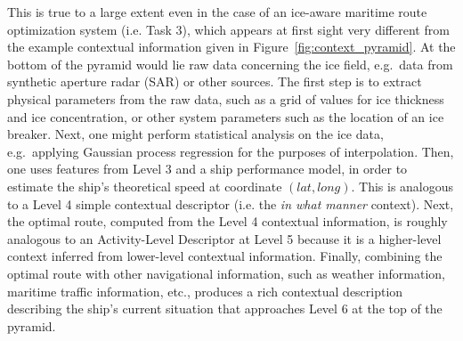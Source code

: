 This is true to a large extent even in the case of an ice-aware maritime route optimization system (i.e. Task 3), which appears at first sight very different from the example contextual information given in Figure~\ref{fig:context_pyramid}. At the bottom of the pyramid would lie raw data concerning the ice field, e.g.\ data from synthetic aperture radar (SAR) or other sources. The first step is to extract physical parameters from the raw data, such as a grid of values for ice thickness and ice concentration, or other system parameters such as the location of an ice breaker. Next, one might perform statistical analysis on the ice data, e.g.\ applying Gaussian process regression for the purposes of interpolation. Then, one uses features from Level 3 and a ship performance model, in order to estimate the ship's theoretical speed at coordinate $(lat, long)$. This is analogous to a Level 4 simple contextual descriptor (i.e. the \emph{in what manner} context). Next, the optimal route, computed from the Level 4 contextual information, is roughly analogous to an Activity-Level Descriptor at Level 5 because it is a higher-level context inferred from lower-level contextual information. Finally, combining the optimal route with other navigational information, such as weather information, maritime traffic information, etc., produces a rich contextual description describing the ship's current situation that approaches Level 6 at the top of the pyramid.
%
